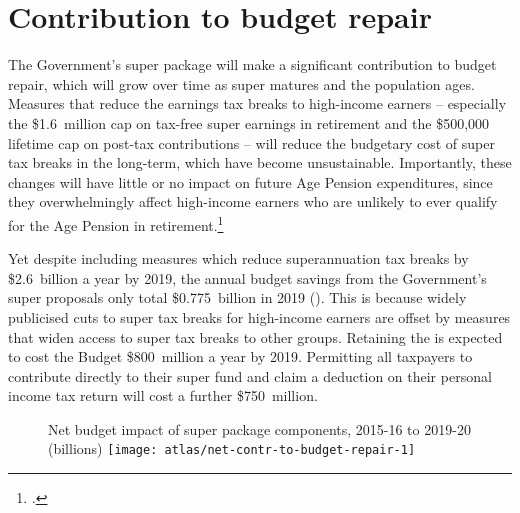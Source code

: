 \documentclass[continuous]{grattan}\usepackage[]{graphicx}\usepackage[]{color}
\newenvironment{knitrout}{}{} %
\begin{document}
\chapter{Contribution to budget repair}\label{chap:contr-to-budget-repair}
The Government’s super package will make a significant contribution to budget repair, which will grow over time as super matures and the population ages. 
Measures that reduce the earnings tax breaks to high-income earners – especially the \$1.6~million cap on tax-free super earnings in retirement and the \$500,000 lifetime cap on post-tax contributions -- will reduce the budgetary cost of super tax breaks in the long-term, which have become unsustainable. 
Importantly, these changes will have little or no impact on future Age Pension expenditures, since they overwhelmingly affect high-income earners who are unlikely to ever qualify for the Age Pension in retirement.\footcite[][29]{DaleyCoatesWoodEtAl2015Super}

Yet despite including measures which reduce superannuation tax breaks by \$2.6~billion a year by 2019, the annual budget savings from the Government’s super proposals only total \$0.775~billion in 2019 (). 
This is because widely publicised cuts to super tax breaks for high-income earners are offset by measures that widen access to super tax breaks to other groups. 
Retaining the \LISTO{} is expected to cost the Budget \$800~million a year by 2019. 
Permitting all taxpayers to contribute directly to their super fund and claim a deduction on their personal income tax return will cost a further \$750~million. 

\begin{figure}
%
{Net budget impact of super package components, 2015-16 to 2019-20 (billions)}
\begin{knitrout}
\color{fgcolor}
\texttt{[image: atlas/net-contr-to-budget-repair-1]} 

\end{knitrout}
\end{figure}
\end{document}
